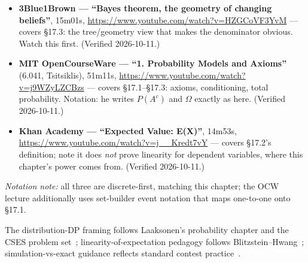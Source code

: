 \begin{rulebox}
\begin{itemize}
\item \textbf{3Blue1Brown --- ``Bayes theorem, the geometry of
changing beliefs''}, 15m01s,
\url{https://www.youtube.com/watch?v=HZGCoVF3YvM} --- covers
\S17.3: the tree/geometry view that makes the denominator
obvious. Watch this first. (Verified 2026-10-11.)
\item \textbf{MIT OpenCourseWare --- ``1. Probability Models
and Axioms''} (6.041, Tsitsiklis), 51m11s,
\url{https://www.youtube.com/watch?v=j9WZyLZCBzs} --- covers
\S17.1--\S17.3: axioms, conditioning, total probability.
Notation: he writes $P(A^c)$ and $\Omega$ exactly as here.
(Verified 2026-10-11.)
\item \textbf{Khan Academy --- ``Expected Value: E(X)''},
14m53s, \url{https://www.youtube.com/watch?v=j__Kredt7vY} ---
covers \S17.2's definition; note it does \emph{not} prove
linearity for dependent variables, where this chapter's power
comes from. (Verified 2026-10-11.)
\end{itemize}
\emph{Notation note:} all three are discrete-first, matching
this chapter; the OCW lecture additionally uses set-builder
event notation that maps one-to-one onto \S17.1.
\end{rulebox}
The distribution-DP framing follows Laaksonen's probability
chapter and the CSES problem set~\cite{laaksonen2024,cses};
linearity-of-expectation pedagogy follows
Blitzstein--Hwang~\cite{blitzstein2019}; simulation-vs-exact
guidance reflects standard contest practice~\cite{cpalgorithms}.
